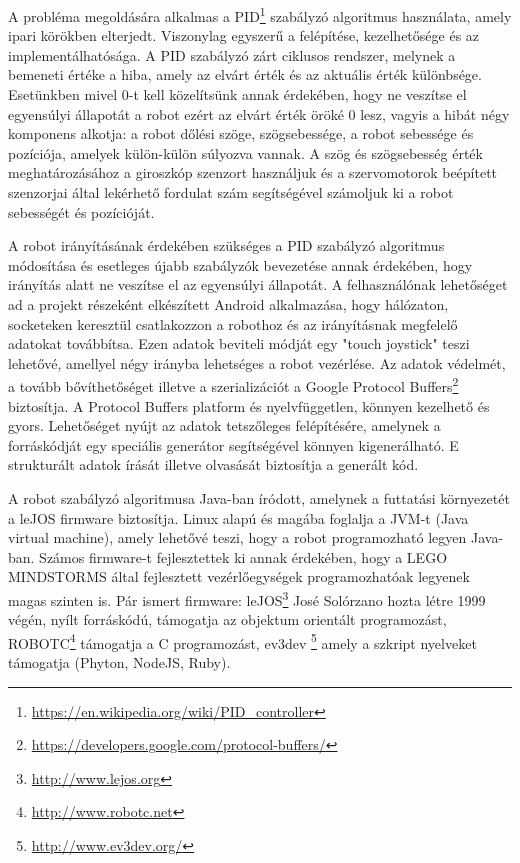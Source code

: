 A probléma megoldására alkalmas a PID\footnote{\href{https://en.wikipedia.org/wiki/PID\_controller}{https://en.wikipedia.org/wiki/PID\_controller}} szabályzó algoritmus használata, amely ipari körökben elterjedt. Viszonylag egyszerű a felépítése, kezelhetősége és az implementálhatósága. A PID szabályzó zárt ciklusos rendszer, melynek a bemeneti értéke a hiba, amely az elvárt érték és az aktuális érték különbsége. Esetünkben mivel 0-t kell közelítsünk annak érdekében, hogy ne veszítse el egyensúlyi állapotát a robot ezért az elvárt érték öröké 0 lesz, vagyis a hibát négy komponens alkotja: a robot dőlési szöge, szögsebessége, a robot sebessége és pozíciója, amelyek külön-külön súlyozva vannak. A szög és szögsebesség érték meghatározásához a giroszkóp szenzort használjuk és a szervomotorok beépített szenzorjai által lekérhető fordulat szám segítségével számoljuk ki a robot sebességét és pozícióját.

A robot irányításának érdekében szükséges a PID szabályzó algoritmus módosítása és esetleges újabb szabályzók bevezetése annak érdekében, hogy irányítás alatt ne veszítse el az egyensúlyi állapotát. A felhasználónak lehetőséget ad a projekt részeként elkészített Android alkalmazása, hogy hálózaton, socketeken keresztül csatlakozzon a robothoz és az irányításnak megfelelő adatokat továbbítsa. Ezen adatok beviteli módját egy "touch joystick" teszi lehetővé, amellyel négy irányba lehetséges a robot vezérlése. Az adatok védelmét, a tovább bővíthetőséget illetve a szerializációt a Google Protocol Buffers\footnote{\href {https://developers.google.com/protocol-buffers/}{https://developers.google.com/protocol-buffers/}} biztosítja. A Protocol Buffers platform és nyelvfüggetlen, könnyen kezelhető és gyors. Lehetőséget nyújt az adatok tetszőleges felépítésére, amelynek a forráskódját egy speciális generátor segítségével könnyen kigenerálható. E strukturált adatok írását illetve olvasását biztosítja a generált kód.

A robot szabályzó algoritmusa Java-ban íródott, amelynek a futtatási környezetét a leJOS firmware biztosítja. Linux alapú  és magába foglalja a JVM-t (Java virtual machine), amely lehetővé teszi, hogy a robot programozható legyen Java-ban. Számos firmware-t fejlesztettek ki annak érdekében, hogy a LEGO MINDSTORMS által fejlesztett vezérlőegységek programozhatóak legyenek magas szinten is. Pár ismert firmware: leJOS\footnote{\href{http://www.lejos.org}{http://www.lejos.org}} José Solórzano hozta létre 1999 végén, nyílt forráskódú, támogatja az objektum orientált programozást, ROBOTC\footnote{\href {http://www.robotc.net}{http://www.robotc.net}} támogatja a C programozást, ev3dev \footnote{\href{http://www.ev3dev.org/}{http://www.ev3dev.org/}} amely a szkript nyelveket támogatja (Phyton, NodeJS, Ruby). 

